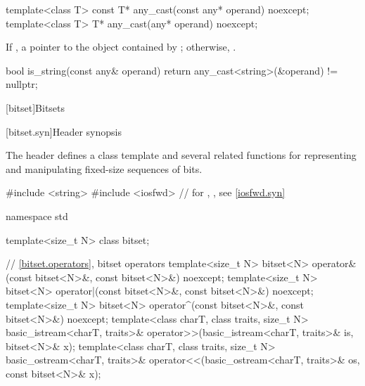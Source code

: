 %
\begin{itemdecl}
template<class T>
  const T* any_cast(const any* operand) noexcept;
template<class T>
  T* any_cast(any* operand) noexcept;
\end{itemdecl}

\begin{itemdescr}
\pnum
\returns
If ,
a pointer to the object contained by ;
otherwise, .

\pnum
\begin{example}
\begin{codeblock}
bool is_string(const any& operand) {
  return any_cast<string>(&operand) != nullptr;
}
\end{codeblock}
\end{example}
\end{itemdescr}

[bitset]{Bitsets}
%

[bitset.syn]{Header  synopsis}%

\pnum
The header  defines a class template
and several related functions for representing
and manipulating fixed-size sequences of bits.

\begin{codeblock}
#include <string>
#include <iosfwd>   // for , , see \ref{iosfwd.syn}

namespace std {
  template<size_t N> class bitset;

  // \ref{bitset.operators}, bitset operators
  template<size_t N>
    bitset<N> operator&(const bitset<N>&, const bitset<N>&) noexcept;
  template<size_t N>
    bitset<N> operator|(const bitset<N>&, const bitset<N>&) noexcept;
  template<size_t N>
    bitset<N> operator^(const bitset<N>&, const bitset<N>&) noexcept;
  template<class charT, class traits, size_t N>
    basic_istream<charT, traits>&
      operator>>(basic_istream<charT, traits>& is, bitset<N>& x);
  template<class charT, class traits, size_t N>
    basic_ostream<charT, traits>&
      operator<<(basic_ostream<charT, traits>& os, const bitset<N>& x);
}
\end{codeblock}


